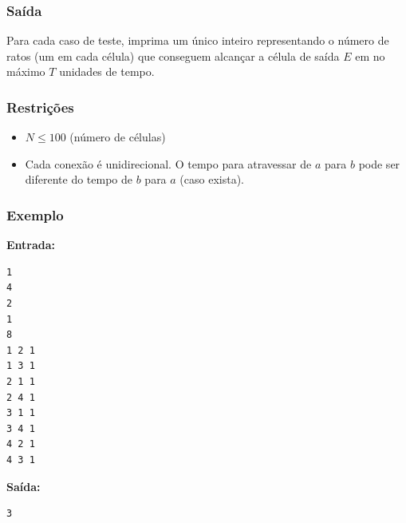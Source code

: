 \subsubsection*{Saída}
Para cada caso de teste, imprima um único inteiro representando o número de ratos (um em cada célula) que conseguem alcançar a célula de saída \( E \) em no máximo \( T \) unidades de tempo.

\subsubsection*{Restrições}
\begin{itemize}
    \item \( N \le 100 \) (número de células)
    \item Cada conexão é unidirecional. O tempo para atravessar de \( a \) para \( b \) pode ser diferente do tempo de \( b \) para \( a \) (caso exista).
\end{itemize}

\subsubsection*{Exemplo}

\textbf{Entrada:}
\begin{verbatim}
1
4
2
1
8
1 2 1
1 3 1
2 1 1
2 4 1
3 1 1
3 4 1
4 2 1
4 3 1
\end{verbatim}

\textbf{Saída:}
\begin{verbatim}
3
\end{verbatim}

